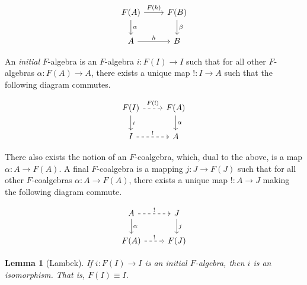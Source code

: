 \documentclass[11pt]{article}
\newtheorem{lemma}{Lemma}
\begin{document}
\[
\begin{tikzcd}
F(A) \arrow{d}{\alpha} \arrow{r}{F(h)} & F(B) \arrow{d}{\beta}\\
A \arrow{r}{h} & B
\end{tikzcd}
\]

An {\em initial} $F$-algebra is an $F$-algebra $i: F(I) \to I$ such that
for all other $F$-algebras $\alpha: F(A) \to A$, there exists a unique map
$!: I \to A$ such that the following diagram commutes.

\[
\begin{tikzcd}
F(I) \arrow{d}{i} \arrow[dashed]{r}{F(!)} & F(A) \arrow{d}{\alpha}\\
I \arrow[dashed]{r}{!} & A
\end{tikzcd}
\]

There also exists the notion of an $F$-coalgebra, which, dual to the above,
is a map $\alpha: A \to F(A)$. A final $F$-coalgebra is a mapping 
$j: J \to F(J)$ such that for all other $F$-coalgebras $\alpha: A \to F(A)$,
there exists a unique map $!: A \to J$ making the following diagram commute.

\[
\begin{tikzcd}
A \arrow{d}{\alpha} \arrow[dashed]{r}{!} & J \arrow{d}{j}\\
F(A) \arrow[dashed]{r}{!} & F(J)
\end{tikzcd}
\]

\begin{lemma}[Lambek]
If $i: F(I) \to I$ is an initial $F$-algebra, then $i$ is an isomorphism.
That is, $F(I) \equiv I$.
\end{lemma}
\end{document}
